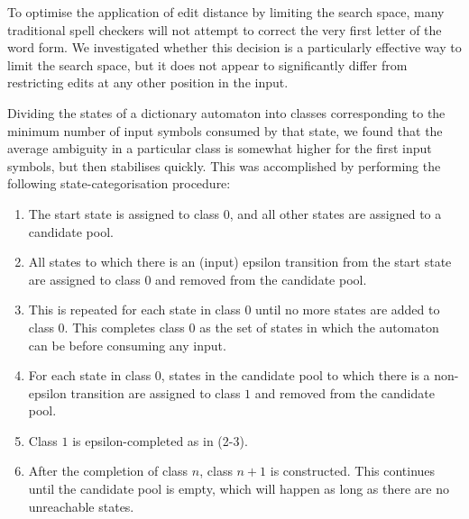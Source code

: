 \documentclass[11pt]{article}
\begin{document}
To optimise the application of edit distance by limiting the search space, many
traditional spell checkers will not attempt to correct the very first letter of
the word form. We investigated whether this decision is a particularly
effective way to limit the search space, but it does not appear to
significantly differ from restricting edits at any other position in the input.

Dividing the states of a dictionary automaton into classes corresponding to
the minimum number of input symbols consumed by that state, we found that
the average ambiguity in a particular class is somewhat higher for the first
input symbols, but then stabilises quickly. This was accomplished by
performing the following
state-categorisation procedure:


\begin{enumerate} \itemsep0pt \parskip0pt 
\item The start state is assigned to class $0$,
and all other states are
assigned to a candidate pool.
\item All states to which there is an (input)
epsilon transition from the start state are assigned to class $0$ and
removed from the candidate pool.
\item This is repeated for each state in
class $0$ until no more states
are added to class $0$. This completes class $0$ as the set of states in which
the automaton can be before consuming any input.
\item For each state in class $0$, states in the candidate pool to which there
is a non-epsilon transition are assigned to class $1$ and removed from the
candidate pool.
\item Class $1$ is epsilon-completed as in (2-3).
\item After the completion of class $n$, class $n+1$ is constructed. This
continues until the candidate pool is empty, which will happen
as long as there are no unreachable states.
\end{enumerate}
\end{document}
